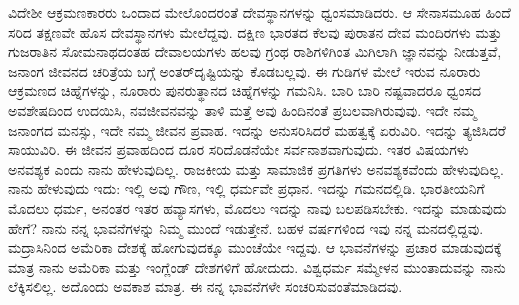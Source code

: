 ವಿದೇಶೀ ಆಕ್ರಮಣಕಾರರು ಒಂದಾದ ಮೇಲೊಂದರಂತೆ ದೇವಸ್ಥಾನಗಳನ್ನು ಧ್ವಂಸಮಾಡಿದರು. ಆ ಸೇನಾಸಮೂಹ ಹಿಂದೆ ಸರಿದ ತಕ್ಷಣವೇ ಹೊಸ ದೇವಸ್ಥಾನಗಳು ಮೇಲೆದ್ದವು. ದಕ್ಷಿಣ ಭಾರತದ ಕೆಲವು ಪುರಾತನ ದೇವ ಮಂದಿರಗಳು ಮತ್ತು ಗುಜರಾತಿನ ಸೋಮನಾಥದಂತಹ ದೇವಾಲಯಗಳು ಹಲವು ಗ್ರಂಥ ರಾಶಿಗಳಿಗಿಂತ ಮಿಗಿಲಾಗಿ ಜ್ಞಾನವನ್ನು ನೀಡುತ್ತವೆ, ಜನಾಂಗ ಜೀವನದ ಚರಿತ್ರೆಯ ಬಗ್ಗೆ ಅಂತರ್​ದೃಷ್ಟಿಯನ್ನು ಕೊಡಬಲ್ಲವು. ಈ ಗುಡಿಗಳ ಮೇಲೆ ಇರುವ ನೂರಾರು ಆಕ್ರಮಣದ ಚಿಹ್ನೆಗಳನ್ನು, ನೂರಾರು ಪುನರುತ್ಥಾನದ ಚಿಹ್ನೆಗಳನ್ನು ಗಮನಿಸಿ. ಬಾರಿ ಬಾರಿ ನಷ್ಟವಾದರೂ ಧ್ವಂಸದ ಅವಶೇಷದಿಂದ ಉದಯಿಸಿ, ನವಜೀವನವನ್ನು ತಾಳಿ ಮತ್ತೆ ಅವು ಹಿಂದಿನಂತೆ ಪ್ರಬಲವಾಗಿರುವುವು. ಇದೇ ನಮ್ಮ ಜನಾಂಗದ ಮನಸ್ಸು, ಇದೇ ನಮ್ಮ ಜೀವನ ಪ್ರವಾಹ. ಇದನ್ನು ಅನುಸರಿಸಿದರೆ ಮಹತ್ವಕ್ಕೆ ಏರುವಿರಿ. ಇದನ್ನು ತ್ಯಜಿಸಿದರೆ ಸಾಯುವಿರಿ. ಈ ಜೀವನ ಪ್ರವಾಹದಿಂದ ದೂರ ಸರಿದೊಡನೆಯೇ ಸರ್ವನಾಶವಾಗುವುದು. ಇತರ ವಿಷಯಗಳು ಅನವಶ್ಯಕ ಎಂದು ನಾನು ಹೇಳುವುದಿಲ್ಲ. ರಾಜಕೀಯ ಮತ್ತು ಸಾಮಾಜಿಕ ಪ್ರಗತಿಗಳು ಅನವಶ್ಯಕವೆಂದು ಹೇಳುವುದಿಲ್ಲ. ನಾನು ಹೇಳುವುದು ಇದು: ಇಲ್ಲಿ ಅವು ಗೌಣ, ಇಲ್ಲಿ ಧರ್ಮವೇ ಪ್ರಧಾನ. ಇದನ್ನು ಗಮನದಲ್ಲಿಡಿ. ಭಾರತೀಯನಿಗೆ ಮೊದಲು ಧರ್ಮ, ಅನಂತರ ಇತರ ಹವ್ಯಾಸಗಳು, ಮೊದಲು ಇದನ್ನು ನಾವು ಬಲಪಡಿಸಬೇಕು. ಇದನ್ನು ಮಾಡುವುದು ಹೇಗೆ? ನಾನು ನನ್ನ ಭಾವನೆಗಳನ್ನು ನಿಮ್ಮ ಮುಂದೆ ಇಡುತ್ತೇನೆ. ಬಹಳ ವರ್ಷಗಳಿಂದ ಇವು ನನ್ನ ಮನದಲ್ಲಿದ್ದವು. ಮದ್ರಾಸಿನಿಂದ ಅಮೆರಿಕಾ ದೇಶಕ್ಕೆ ಹೋಗುವುದಕ್ಕೂ ಮುಂಚೆಯೇ ಇದ್ದವು. ಆ ಭಾವನೆಗಳನ್ನು ಪ್ರಚಾರ ಮಾಡುವುದಕ್ಕೆ ಮಾತ್ರ ನಾನು ಅಮೆರಿಕಾ ಮತ್ತು ಇಂಗ್ಲೆಂಡ್​ ದೇಶಗಳಿಗೆ ಹೋದುದು. ವಿಶ್ವಧರ್ಮ ಸಮ್ಮೇಳನ ಮುಂತಾದುವನ್ನು ನಾನು ಲೆಕ್ಕಿಸಲಿಲ್ಲ. ಅದೊಂದು ಅವಕಾಶ ಮಾತ್ರ. ಈ ನನ್ನ ಭಾವನೆಗಳೇ ಸಂಚರಿಸುವಂತೆಮಾಡಿದವು.

